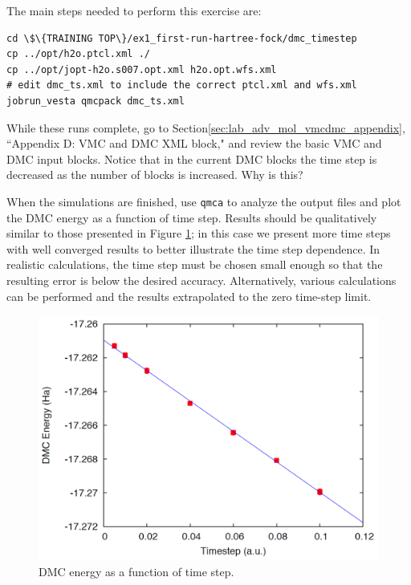 The main steps needed to perform this exercise are:
\begin{lstlisting}[style=SHELL]
cd \$\{TRAINING TOP\}/ex1_first-run-hartree-fock/dmc_timestep
cp ../opt/h2o.ptcl.xml ./
cp ../opt/jopt-h2o.s007.opt.xml h2o.opt.wfs.xml
# edit dmc_ts.xml to include the correct ptcl.xml and wfs.xml
jobrun_vesta qmcpack dmc_ts.xml
\end{lstlisting}
While these runs complete, go to Section\ref{sec:lab_adv_mol_vmcdmc_appendix}, ``Appendix D: VMC and DMC XML block," and review the basic VMC and DMC input
blocks. Notice that in the current DMC blocks the time step is decreased as the number of blocks is increased. Why is this?

When the simulations are finished, use \texttt{qmca} to analyze the output files and plot the
DMC energy as a function of time step. Results should be qualitatively similar to those
presented in Figure \ref{fig:lam_dmc_timestep}; in this case we present more time steps with well converged results to
better illustrate the time step dependence. In realistic calculations, the time step must be
chosen small enough so that the resulting error is below the desired accuracy. Alternatively,
various calculations can be performed and the results extrapolated to the zero time-step
limit.


\begin{figure}
\begin{center}
\includegraphics[trim = 0mm 0mm 0mm 0mm, clip,width=0.75\columnwidth]{./figures/lab_advanced_molecules_dmc_timestep.png}
\end{center}
\caption{DMC energy as a function of time step.}
\label{fig:lam_dmc_timestep}
\end{figure}


